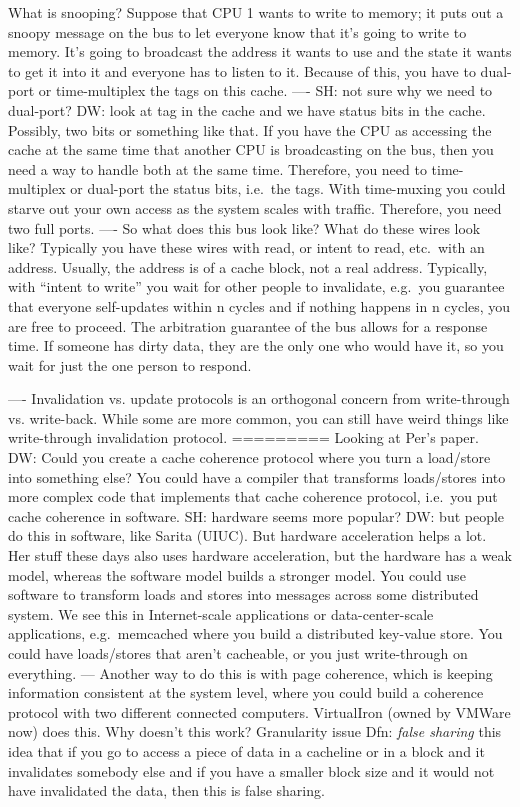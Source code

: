 What is snooping?
Suppose that CPU 1 wants to write to memory; it puts out a snoopy message on the bus to let everyone know that it's going to write to memory.
It's going to broadcast the address it wants to use and the state it wants to get it into it and everyone has to listen to it.
Because of this, you have to dual-port or time-multiplex the tags on this cache.
----
SH: not sure why we need to dual-port?
DW: look at tag in the cache and we have status bits in the cache.
Possibly, two bits or something like that.
If you have the CPU as accessing the cache at the same time that another CPU is broadcasting on the bus, then you need a way to handle both at the same time.
Therefore, you need to time-multiplex or dual-port the status bits, i.e.\ the tags.
With time-muxing you could starve out your own access as the system scales with traffic.
Therefore, you need two full ports.
----
So what does this bus look like?
What do these wires look like?
Typically you have these wires with read, or intent to read, etc.\ with an address.
Usually, the address is of a cache block, not a real address.
Typically, with ``intent to write'' you wait for other people to invalidate, e.g.\ you guarantee that everyone self-updates within n cycles and if nothing happens in n cycles, you are free to proceed.
The arbitration guarantee of the bus allows for a response time.
If someone has dirty data, they are the only one who would have it, so you wait for just the one person to respond.

----
Invalidation vs. update protocols is an orthogonal concern from write-through vs. write-back. While some are more common, you can still have weird things like write-through invalidation protocol.
=========
Looking at Per's paper.
DW: Could you create a cache coherence protocol where you turn a load/store into something else?
You could have a compiler that transforms loads/stores into more complex code that implements that cache coherence protocol, i.e.\ you put cache coherence in software.
SH: hardware seems more popular?
DW: but people do this in software, like Sarita (UIUC). But hardware acceleration helps a lot.
Her stuff these days also uses hardware acceleration, but the hardware has a weak model, whereas the software model builds a stronger model.
You could use software to transform loads and stores into messages across some distributed system.
We see this in Internet-scale applications or data-center-scale applications, e.g.\ memcached where you build a distributed key-value store.
You could have loads/stores that aren't cacheable, or you just write-through on everything.
---
Another way to do this is with page coherence, which is keeping information consistent at the system level, where you could build a coherence protocol with two different connected computers.
VirtualIron (owned by VMWare now) does this.
Why doesn't this work? Granularity issue
Dfn: \textit{false sharing} this idea that if you go to access a piece of data in a cacheline or in a block and it invalidates somebody else and if you have a smaller block size and it would not have invalidated the data, then this is false sharing.



